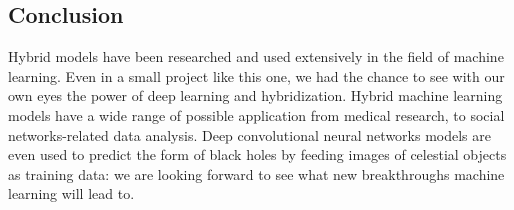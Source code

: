 \documentclass[10pt,a4paper]{article}
\begin{document}
	\subsection{Conclusion}
	Hybrid models have been researched and used extensively in the field of machine learning. Even in a small project like this one, we had the chance to see with our own eyes the power of deep learning and hybridization. Hybrid machine learning models have a wide range of possible application from medical research, to social networks-related data analysis. Deep convolutional neural networks models are even used to predict the form of black holes by feeding images of celestial objects as training data\cite{DBLP:journals/corr/GeorgeH17}: we are looking forward to see what new breakthroughs machine learning will lead to.
		\begin{figure}
		\centering
		

\end{figure}
\end{document}
